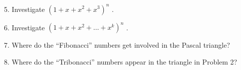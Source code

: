 \documentclass[10pt,]{book}
\theoremstyle{plain}
\theoremstyle{definition}
\theoremstyle{definition}
\theoremstyle{definition}
\numberwithin{equation}{chapter}
\begin{document}
\begin{exerciselist}
\par\smallskip
\item[5.]\hypertarget{exercise-31}{}\hypertarget{p-1784}{}%
Investigate \(\left( 1 + x + x^{2} + x^{3} \right)^{n}\) .%
\par\smallskip
\item[6.]\hypertarget{exercise-32}{}\hypertarget{p-1785}{}%
Investigate \(\left( 1 + x + x^{2} + \ldots + x^{k} \right)^{n}\) .%
\par\smallskip
\item[7.]\hypertarget{exercise-33}{}\hypertarget{p-1786}{}%
Where do the ``Fibonacci'' numbers get involved in the Pascal triangle?%
\par\smallskip
\item[8.]\hypertarget{exercise-34}{}\hypertarget{p-1787}{}%
Where do the ``Tribonacci'' numbers appear in the triangle in Problem 2?%
\par\smallskip
\end{exerciselist}
\typeout{************************************************}
\typeout{************************************************}
\end{document}
